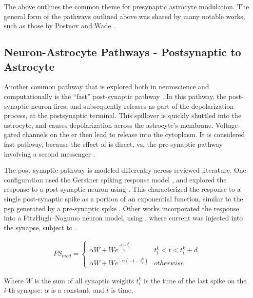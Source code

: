     The above outlines the common theme for presynaptic astrocyte
    modulation. The general form of the pathways outlined above was shared by many
    notable works, such as those by Postnov and Wade \parencite{postnov_2009,
      wade_2011}.

    \subsection{Neuron-Astrocyte Pathways - Postsynaptic to Astrocyte}
    Another common pathway that is explored both in neuroscience and
    computationally is the ``fast'' post-synaptic pathway
    \parencite{bassam_2015}. In this pathway, the post-synaptic neuron fires,
    and subsequently releases \kp as part of the depolarization process, at the
    postsynaptic terminal. This \kp spillover is quickly shuttled into the
    astrocyte, and causes depolarization across the astrocyte's
    membrane. Voltage-gated channels on the \gls{er} then lead to \ca release
    into the cytoplasm. It is considered fast pathway, because the effect of \kp
    is direct, vs. the pre-synaptic pathway involving a second messenger
    \parencite{bassam_2015}.

    The post-synaptic pathway is modeled differently across reviewed
    literature. One configuration used the Gerstner spiking
    response model \parencite{gerstner_2001}, and explored the \ca response to a
    post-synaptic neuron using . This
    characterized the response to a single post-synaptic spike as a portion of
    an exponential function, similar to the \gls{psp} generated by a
    pre-synaptic spike \parencite{bassam_2015}. Other works incorporated the \ca
    response into a FitzHugh–Nagumo neuron model, using ,
    where current was injected into the synapse, subject to 
    \parencite{postnov_2007}.

    \begin{align}
        PS_{mod} =
        \begin{cases}
          \alpha W + We^{\frac{-t - t^k_{i}}{\tau_s}} & t^k_{i} < t < t^k_{i}
          + d \\
          \alpha W + We^{-\alpha (-t - t^k_{i})} & otherwise
       \end{cases} \label{eq:kp_path_srm}      
    \end{align}

    Where $W$ is the sum of all synaptic weights $t^k_i$ is the time of the last
    spike on the $i$-th synapse. $\alpha$ is a constant, and $t$ is time.

